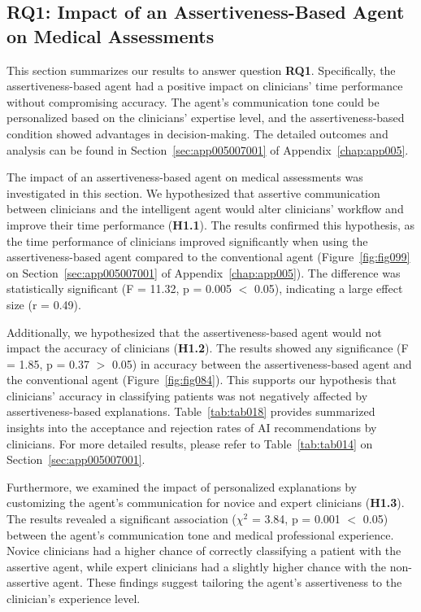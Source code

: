 \subsection{RQ1: Impact of an Assertiveness-Based Agent on Medical Assessments}
\label{sec:chap006006001}

This section summarizes our results to answer question {\bf RQ1}.
Specifically, the assertiveness-based agent had a positive impact on clinicians' time performance without compromising accuracy.
The agent's communication tone could be personalized based on the clinicians' expertise level, and the assertiveness-based condition showed advantages in decision-making.
The detailed outcomes and analysis can be found in Section~\ref{sec:app005007001} of Appendix~\ref{chap:app005}.

The impact of an assertiveness-based agent on medical assessments was investigated in this section.
We hypothesized that assertive communication between clinicians and the intelligent agent would alter clinicians' workflow and improve their time performance ({\bf H1.1}).
The results confirmed this hypothesis, as the time performance of clinicians improved significantly when using the assertiveness-based agent compared to the conventional agent (Figure~\ref{fig:fig099} on Section~\ref{sec:app005007001} of Appendix~\ref{chap:app005}).
The difference was statistically significant (F = 11.32, p = 0.005 $<$ 0.05), indicating a large effect size (r = 0.49).

Additionally, we hypothesized that the assertiveness-based agent would not impact the accuracy of clinicians (\textbf{H1.2}).
The results showed any significance (F = 1.85, p = 0.37 $>$ 0.05) in accuracy between the assertiveness-based agent and the conventional agent (Figure~\ref{fig:fig084}).
This supports our hypothesis that clinicians' accuracy in classifying patients was not negatively affected by assertiveness-based explanations.
Table~\ref{tab:tab018} provides summarized insights into the acceptance and rejection rates of \ac{AI} recommendations by clinicians.
For more detailed results, please refer to Table~\ref{tab:tab014} on Section~\ref{sec:app005007001}.



Furthermore, we examined the impact of personalized explanations by customizing the agent's communication for novice and expert clinicians (\textbf{H1.3}).
The results revealed a significant association ($\chi^2$ = 3.84, p = 0.001 $<$ 0.05) between the agent's communication tone and medical professional experience.
Novice clinicians had a higher chance of correctly classifying a patient with the assertive agent, while expert clinicians had a slightly higher chance with the non-assertive agent.
These findings suggest tailoring the agent's assertiveness to the clinician's experience level.

